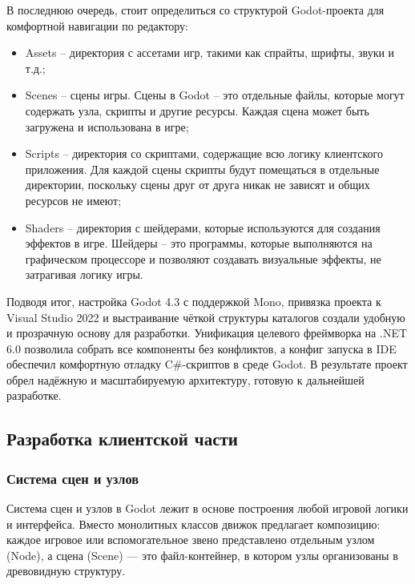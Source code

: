         В последнюю очередь, стоит определиться со структурой Godot-проекта для комфортной навигации по редактору:
        \begin{itemize}
            \item Assets -- директория с ассетами игр, такими как спрайты, шрифты, звуки и т.д.;
            \item Scenes -- сцены игры. Сцены в Godot -- это отдельные файлы, которые могут содержать узла, скрипты и другие ресурсы. Каждая сцена может быть загружена и использована в игре;
            \item Scripts -- директория со скриптами, содержащие всю логику клиентского приложения. Для каждой сцены скрипты будут помещаться в отдельные директории, поскольку сцены друг от друга никак не зависят и общих ресурсов не имеют;
            \item Shaders -- директория с шейдерами, которые используются для создания эффектов в игре. Шейдеры -- это программы, которые выполняются на графическом процессоре и позволяют создавать визуальные эффекты, не затрагивая логику игры.
        \end{itemize}

        Подводя итог, настройка Godot 4.3 с поддержкой Mono, привязка проекта к Visual Studio 2022 и выстраивание чёткой структуры каталогов 
        создали удобную и прозрачную основу для разработки. 
        Унификация целевого фреймворка на .NET 6.0 позволила собрать все компоненты без конфликтов, а конфиг запуска в IDE обеспечил комфортную отладку C\#-скриптов в среде Godot. 
        В результате проект обрел надёжную и масштабируемую архитектуру, готовую к дальнейшей разработке.


    \subsection{Разработка клиентской части}

        \subsubsection{Система сцен и узлов}
        
        Система сцен и узлов в Godot лежит в основе построения любой игровой логики и интерфейса. Вместо монолитных классов движок предлагает композицию: каждое игровое или вспомогательное 
        звено представлено отдельным узлом (Node), а сцена (Scene) — это файл-контейнер, в котором узлы организованы в древовидную структуру.

